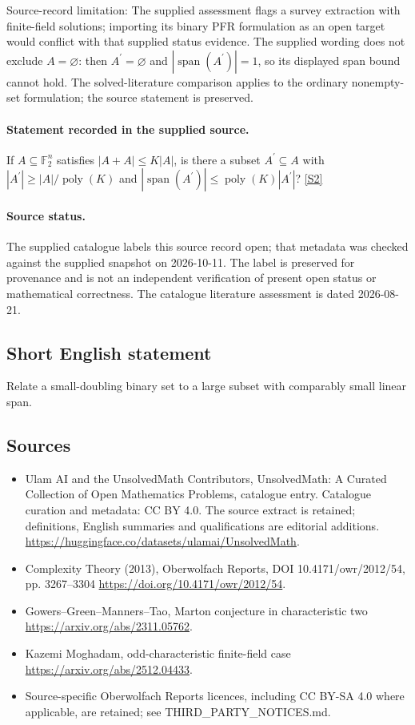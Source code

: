\documentclass[11pt]{article}
\begin{document}
Source-record limitation: The supplied assessment flags a survey extraction with finite-field solutions; importing its binary PFR formulation as an open target would conflict with that supplied status evidence. The supplied wording does not exclude $A=\varnothing$: then $A^{\prime}=\varnothing$ and $|\operatorname{span}(A^{\prime})|=1$, so its displayed span bound cannot hold. The solved-literature comparison applies to the ordinary nonempty-set formulation; the source statement is preserved.
\paragraph{Statement recorded in the supplied source.}
If $A\subseteq\mathbb F_2^n$ satisfies $|A+A|\leq K|A|$, is there a subset $A^{\prime}\subseteq A$ with $|A^{\prime}|\geq |A|/\operatorname{poly}(K)$ and $|\operatorname{span}(A^{\prime})|\leq\operatorname{poly}(K)|A^{\prime}|$? \href{https://doi.org/10.4171/owr/2012/54}{[S2]}
\paragraph{Source status.}
The supplied catalogue labels this source record open; that metadata was checked against the supplied snapshot on 2026-10-11. The label is preserved for provenance and is not an independent verification of present open status or mathematical correctness. The catalogue literature assessment is dated 2026-08-21.
\subsection{Short English statement}
Relate a small-doubling binary set to a large subset with comparably small linear span.
\subsection{Sources}
\begin{itemize}
\item[S1] Ulam AI and the UnsolvedMath Contributors, UnsolvedMath: A Curated Collection of Open Mathematics Problems, catalogue entry. Catalogue curation and metadata: CC BY 4.0. The source extract is retained; definitions, English summaries and qualifications are editorial additions.
\url{https://huggingface.co/datasets/ulamai/UnsolvedMath}.
\item[S2] Complexity Theory (2013), Oberwolfach Reports, DOI 10.4171/owr/2012/54, pp. 3267--3304
\url{https://doi.org/10.4171/owr/2012/54}.
\item[S3] Gowers--Green--Manners--Tao, Marton conjecture in characteristic two
\url{https://arxiv.org/abs/2311.05762}.
\item[S4] Kazemi Moghadam, odd-characteristic finite-field case
\url{https://arxiv.org/abs/2512.04433}.
\item Source-specific Oberwolfach Reports licences, including CC BY-SA 4.0 where applicable, are retained; see THIRD\_PARTY\_NOTICES.md.
\end{itemize}
\end{document}
